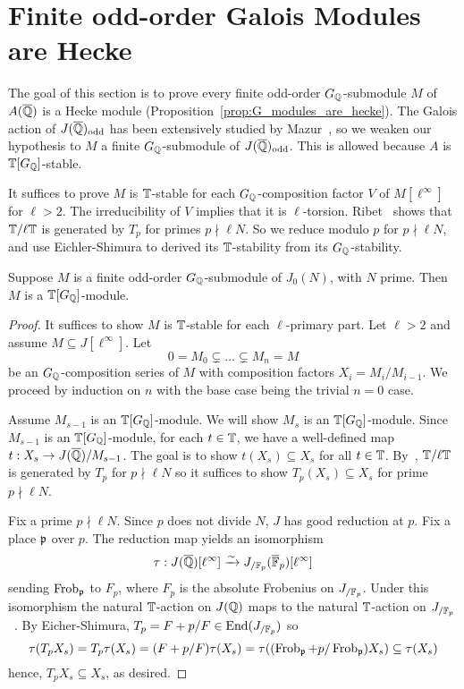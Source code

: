 \documentclass[thesis.tex]{subfiles}
\begin{document}
\section{Finite odd-order Galois Modules are Hecke}%
\label{sec:finite_odd_order_galois_modules_are_hecke}

The goal of this section is to prove every finite odd-order $G_{\mathbb{Q}}$-submodule
$M$ of $A(\overline{\mathbb{Q}})$ is a Hecke module
(Proposition~\ref{prop:G_modules_are_hecke}). The Galois action of
$J(\overline{\mathbb{Q}})_{\mathrm{odd}}$ has been extensively studied by Mazur~\cite{mazur:eisenstein},
so we weaken our hypothesis to $M$ a finite $G_{\mathbb{Q}}$-submodule of
$J(\overline{\mathbb{Q}})_{\mathrm{odd}}$. This is allowed because $A$ is $\mathbb{T}[G_{\mathbb{Q}}]$-stable.

It suffices to prove $M$ is $\mathbb{T}$-stable for each $G_{\mathbb{Q}}$-composition factor $V$
of $M[\ell^\infty]$ for $\ell>2$. The irreducibility of $V$ implies that it is
$\ell$-torsion. Ribet~\cite[Proposition 6.1]{ribet:semistable_gal} shows that
$\mathbb{T}/\ell \mathbb{T}$ is generated by $T_p$ for primes $p\nmid \ell N$. So we reduce
modulo $p$ for $p\nmid \ell N$, and use Eichler-Shimura to derived its
$\mathbb{T}$-stability from its $G_{\mathbb{Q}}$-stability.

\begin{proposition}\label{prop:G_modules_are_hecke}
    Suppose $M$ is a finite odd-order $G_{\mathbb{Q}}$-submodule of $J_0(N)$, with $N$
    prime. Then $M$ is a $\mathbb{T}[G_{\mathbb{Q}}]$-module.
\end{proposition}
\begin{proof}
    It suffices to show $M$ is $\mathbb{T}$-stable for each $\ell$-primary part. Let
    $\ell>2$ and assume $M\subseteq J[\ell^\infty]$. Let
    \[
        0 = M_0 \subsetneq \ldots \subsetneq M_n = M
    \]
    be an $G_{\mathbb{Q}}$-composition series of $M$ with composition factors $X_i =
    M_i/M_{i-1}$. We proceed by induction on $n$ with the base
    case being the trivial $n=0$ case.

    Assume $M_{s-1}$ is an $\mathbb{T}[G_{\mathbb{Q}}]$-module. We will show $M_s$ is an
    $\mathbb{T}[G_{\mathbb{Q}}]$-module. Since $M_{s-1}$ is an $\mathbb{T}[G_{\mathbb{Q}}]$-module, for each
    $t\in \mathbb{T}$, we have a well-defined map $t:X_s\to J(\overline{\mathbb{Q}})/M_{s-1}$. The
    goal is to show $t(X_s)\subseteq X_s$ for all $t\in \mathbb{T}$.
    By~\cite[Proposition 2]{ribet:mult_p_finite}, $\mathbb{T}/\ell \mathbb{T}$ is generated
    by $T_p$ for $p\nmid \ell N$ so it suffices to show $T_p(X_s)\subseteq X_s$
    for prime $p\nmid \ell N$.

    Fix a prime $p\nmid \ell N$. Since $p$ does not divide $N$, $J$ has good
    reduction at $p$. Fix a place $\mathfrak{p}$ over $p$. The reduction map yields an
    isomorphism~\cite[Theorem 1, Lemma 2]{serre-tate}
    \[
        \tau:J(\overline{\mathbb{Q}})[\ell^\infty] \xrightarrow{\sim} J_{/\mathbb{F}_p} (\overline{\mathbb{F}}_p)[\ell^\infty]
    \]
    sending $\operatorname{Frob}_{\mathfrak{p}}$ to $F_p$, where $F_p$ is the absolute Frobenius on
    $J_{/\mathbb{F}_p}$. Under this isomorphism the natural $\mathbb{T}$-action on $J(\mathbb{Q})$
    maps to the natural $\mathbb{T}$-action on $J_{/\mathbb{F}_p}$~\cite[\S
    5.2]{ribet-stein:serre}. By Eicher-Shimura, $T_p = F+p/F\in
    \operatorname{End}(J_{/\mathbb{F}_p})$ so
    \[
        \tau(T_p X_s)
        = T_p\tau(X_s)
        = (F+p/F)\tau(X_s)
        = \tau((\operatorname{Frob}_{\mathfrak{p}}+p/\operatorname{Frob}_{\mathfrak{p}})X_s)
        \subseteq \tau(X_s)
    \]
    hence, $T_p X_s\subseteq X_s$, as desired.
\end{proof}
\end{document}
